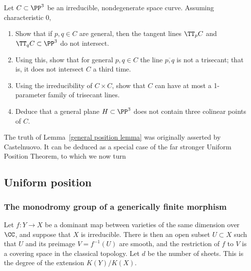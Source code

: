 \begin{exercise}
Let $C \subset \PP^3$ be an irreducible, nondegenerate space curve. Assuming characteristic 0,
\begin{enumerate}
\item Show that if $p, q \in C$ are general, then the tangent lines $\TT_pC$ and $\TT_qC \subset \PP^3$ do not intersect.
\item Using this, show that for general $p, q \in C$ the line $\overline{p,q}$ is not a trisecant; that is, it does not intersect $C$ a third time.
\item Using the irreducibility of $C \times C$, show that $C$ can have at most a 1-parameter family of trisecant lines.
\item Deduce that a general plane $H \subset \PP^3$ does not contain three colinear points of $C$.
\end{enumerate}
\end{exercise}

The truth of Lemma~\ref{general position lemma} was originally asserted by Castelnuovo. It can be deduced as a special case of the far stronger Uniform Position Theorem, to which we now turn

\subsection{Uniform position} 

\subsubsection{The monodromy group of a generically finite morphism}

Let $f : Y \to X$ be a dominant map between varieties of the same dimension over $\CC$, and suppose that $X$ is irreducible. There is then an open subset $U \subset X$ such that $U$ and 
its preimage $V = f^{-1}(U)$ are smooth, and the restriction of $f$ to $V$ is a covering space in the classical topology. Let $d$ be the number of sheets. This is the degree of the extension $K(Y)/K(X)$.

